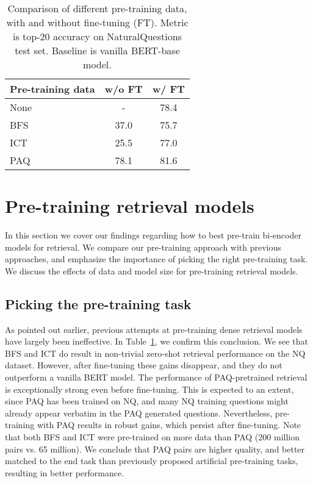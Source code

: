 \documentclass[11pt]{article}
\begin{document}
\begin{table}
\centering

\begin{tabular}{lcc}
 \toprule
 \textbf{Pre-training data} & \textbf{w/o FT} & \textbf{w/ FT}  \\
\midrule
None & - & 78.4 \\
BFS & 37.0 & 75.7 \\
ICT & 25.5 & 77.0 \\
PAQ & 78.1 & 81.6 \\

\bottomrule
\end{tabular}
\caption{Comparison of different pre-training data, with and without fine-tuning (FT). Metric is top-20 accuracy on NaturalQuestions test set. Baseline is vanilla BERT-base model.}
\label{tab:pretraining}
\end{table} 
\section{Pre-training retrieval models}

In this section we cover our findings regarding how to best pre-train bi-encoder models for retrieval.  We compare our pre-training approach with previous approaches, and emphasize the importance of picking the right pre-training task.  We discuss the effects of data and model size for pre-training retrieval models.

\subsection{Picking the pre-training task}
As pointed out earlier, previous attempts at pre-training dense retrieval models have largely been ineffective.  In Table~\ref{tab:pretraining}, we confirm this conclusion.  We see that BFS and ICT do result in non-trivial zero-shot retrieval performance on the NQ dataset. However, after fine-tuning these gains disappear, and they do not outperform a vanilla BERT model.  
The performance of PAQ-pretrained retrieval is exceptionally strong even before fine-tuning.  This is expected to an extent, since PAQ has been trained on NQ, and many NQ training questions might already appear verbatim in the PAQ generated questions.  Nevertheless, pre-training with PAQ results in robust gains, which persist after fine-tuning.  Note that both BFS and ICT were pre-trained on more data than PAQ (200 million pairs vs. 65 million).  We conclude that PAQ pairs are higher quality, and better matched to the end task than previously proposed artificial pre-training tasks, resulting in better performance.
\end{document}
